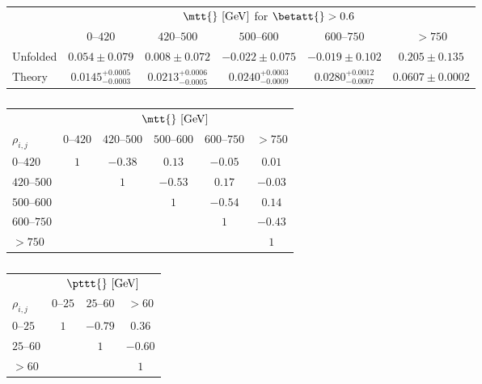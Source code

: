 \begin{table}[!htp]\centering
\caption{ }
\begin{tabular}{l c c c c c }
  \toprule
  &\multicolumn{5}{c}{$\mtt{}~[\rm{GeV}]$ for $\betatt{} > 0.6$}    \\
  \ac{} & $0$--$420$ & $420$--$500$ & $500$--$600$ & $600$--$750$ & $>750$ \\
  \midrule
  Unfolded  & $0.054 \pm  0.079 $ & $0.008 \pm 0.072  $ & $-0.022 \pm 0.075 $ & $-0.019 \pm 0.102    $ & $0.205 \pm 0.135$ \\
  Theory & $0.0145^{+0.0005}_{-0.0003}$ & $0.0213^{+0.0006}_{-0.0005}$ & $0.0240^{+0.0003}_{-0.0009}$ & $0.0280^{+0.0012}_{-0.0007}$ & $0.0607 \pm 0.0002$ \\
  \bottomrule
\end{tabular}
\label{tab:results_mtt_beta}
\end{table}


\begin{table}[!htp]\centering
\caption{ }
\begin{tabular}{l c c c c c }
  \toprule
  &\multicolumn{5}{c}{$\mtt{}~[\rm{GeV}]$}    \\
  $\rho_{i,j}$ & $0$--$420$ & $420$--$500$ & $500$--$600$ & $600$--$750$ & $>750$ \\
  \midrule
  $0$--$420$      & $1$ & $-0.38$ & $0.13$  & $-0.05$ & $0.01$  \\
  $420$--$500$    &     & $1$     & $-0.53$ & $0.17$  & $-0.03$ \\
  $500$--$600$    &     &         & $1$     & $-0.54$ & $0.14$  \\
  $600$--$750$    &     &         &         & $1$     & $-0.43$ \\
  $>750$          &     &         &         &         & $1$     \\
  \bottomrule
\end{tabular}
\label{tab:corr_mtt}
\end{table}

\begin{table}[!htp]\centering
\caption{ }
\begin{tabular}{l c c c }
  \toprule
  &\multicolumn{3}{c}{$\pttt{}~[\rm{GeV}]$}    \\
  $\rho_{i,j}$      &     $0$--$25$           &        $25$--$60$         &  $>60$            \\
  \midrule
  $0$--$25$       &    $1$    &    $-0.79$  &   $0.36$  \\
  $25$--$60$      &           &    $1$      &   $-0.60$ \\
  $>60$           &           &             &   $1$     \\
  \bottomrule
\end{tabular}
\label{tab:corr_pttt}
\end{table}

